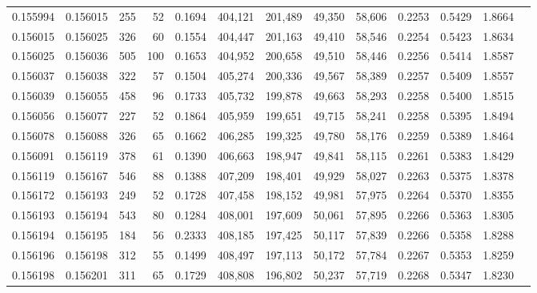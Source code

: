 \begin{tabular}{rrrrrrrrrrrrr}
0.155994 & 0.156015 &   255 &  52 &                                     0.1694 & 404,121 & 201,489 &  49,350 &  58,606 & 0.2253 & 0.5429 & 1.8664 \\
0.156015 & 0.156025 &   326 &  60 &                                     0.1554 & 404,447 & 201,163 &  49,410 &  58,546 & 0.2254 & 0.5423 & 1.8634 \\
0.156025 & 0.156036 &   505 & 100 &                                     0.1653 & 404,952 & 200,658 &  49,510 &  58,446 & 0.2256 & 0.5414 & 1.8587 \\
0.156037 & 0.156038 &   322 &  57 &                                     0.1504 & 405,274 & 200,336 &  49,567 &  58,389 & 0.2257 & 0.5409 & 1.8557 \\
0.156039 & 0.156055 &   458 &  96 &                                     0.1733 & 405,732 & 199,878 &  49,663 &  58,293 & 0.2258 & 0.5400 & 1.8515 \\
0.156056 & 0.156077 &   227 &  52 &                                     0.1864 & 405,959 & 199,651 &  49,715 &  58,241 & 0.2258 & 0.5395 & 1.8494 \\
0.156078 & 0.156088 &   326 &  65 &                                     0.1662 & 406,285 & 199,325 &  49,780 &  58,176 & 0.2259 & 0.5389 & 1.8464 \\
0.156091 & 0.156119 &   378 &  61 &                                     0.1390 & 406,663 & 198,947 &  49,841 &  58,115 & 0.2261 & 0.5383 & 1.8429 \\
0.156119 & 0.156167 &   546 &  88 &                                     0.1388 & 407,209 & 198,401 &  49,929 &  58,027 & 0.2263 & 0.5375 & 1.8378 \\
0.156172 & 0.156193 &   249 &  52 &                                     0.1728 & 407,458 & 198,152 &  49,981 &  57,975 & 0.2264 & 0.5370 & 1.8355 \\
0.156193 & 0.156194 &   543 &  80 &                                     0.1284 & 408,001 & 197,609 &  50,061 &  57,895 & 0.2266 & 0.5363 & 1.8305 \\
0.156194 & 0.156195 &   184 &  56 &                                     0.2333 & 408,185 & 197,425 &  50,117 &  57,839 & 0.2266 & 0.5358 & 1.8288 \\
0.156196 & 0.156198 &   312 &  55 &                                     0.1499 & 408,497 & 197,113 &  50,172 &  57,784 & 0.2267 & 0.5353 & 1.8259 \\
0.156198 & 0.156201 &   311 &  65 &                                     0.1729 & 408,808 & 196,802 &  50,237 &  57,719 & 0.2268 & 0.5347 & 1.8230 \\

\end{tabular}
